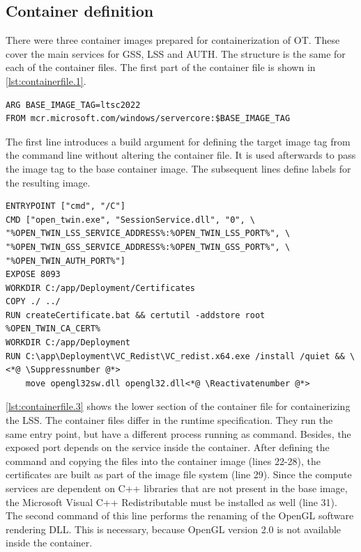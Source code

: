 \subsection{Container definition}
There were three container images prepared for containerization of \ac{OT}. These cover the main services for \ac{GSS}, \ac{LSS} and \ac{AUTH}. The structure is the same for each of the container files. The first part of the container file is shown in \autoref{lst:containerfile.1}.
\begin{lstlisting}[label=lst:containerfile.1, caption={Containerfile for the \ac{LSS}. Description of the base image and variable tagging using a build argument. (\textit{Distribution/Container/session.Containerfile})}, language=docker, firstnumber=1]
ARG BASE_IMAGE_TAG=ltsc2022
FROM mcr.microsoft.com/windows/servercore:$BASE_IMAGE_TAG
\end{lstlisting}
The first line introduces a build argument for defining the target image tag from the command line without altering the container file.  It is used afterwards to pass the image tag to the base container image. The subsequent lines define labels for the resulting image.
\vspace{1em}
\begin{lstlisting}[label=lst:containerfile.3, caption={Containerfile for the \ac{GSS}. Description of the command line and certificate creation. (\textit{Distribution/Container/session.Containerfile})}, language=docker, firstnumber=21]
ENTRYPOINT ["cmd", "/C"]
CMD ["open_twin.exe", "SessionService.dll", "0", \
"%OPEN_TWIN_LSS_SERVICE_ADDRESS%:%OPEN_TWIN_LSS_PORT%", \
"%OPEN_TWIN_GSS_SERVICE_ADDRESS%:%OPEN_TWIN_GSS_PORT%", \
"%OPEN_TWIN_AUTH_PORT%"]
EXPOSE 8093
WORKDIR C:/app/Deployment/Certificates
COPY ./ ../
RUN createCertificate.bat && certutil -addstore root %OPEN_TWIN_CA_CERT%
WORKDIR C:/app/Deployment
RUN C:\app\Deployment\VC_Redist\VC_redist.x64.exe /install /quiet && \<*@ \Suppressnumber @*>
    move opengl32sw.dll opengl32.dll<*@ \Reactivatenumber @*>
\end{lstlisting}
\autoref{lst:containerfile.3} shows the lower section of the container file for containerizing the \ac{LSS}.
The container files differ in the runtime specification. They run the same entry point, but have a different process running as command. Besides, the exposed port depends on the service inside the container. 
After defining the command and copying the files into the container image (lines 22-28), the certificates are built as part of the image file system (line 29).
Since the compute services are dependent on C++ libraries that are not present in the base image, the Microsoft Visual C++ Redistributable must be installed as well (line 31).
The second command of this line performs the renaming of the OpenGL software rendering \ac{DLL}. This is necessary, because OpenGL version 2.0 is not available inside the container.

